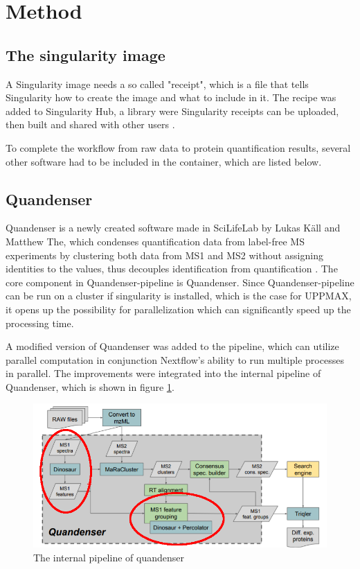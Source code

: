 \section{Method}

\subsection{The singularity image}
A Singularity image needs a so called "receipt", which is a file that tells Singularity how to create the image and what to include in it. The recipe was added to Singularity Hub, a library were Singularity receipts can be uploaded, then built and shared with other users \cite{singularity-hub}.

To complete the workflow from raw data to protein quantification results, several other software had to be included in the container, which are listed below.

\subsection{Quandenser} \label{ssec:quandenser-method}
Quandenser is a newly created software made in SciLifeLab by Lukas Käll and Matthew The, which condenses quantification data from label-free MS experiments by clustering both data from MS1 and MS2 without assigning identities to the values, thus decouples identification from quantification \cite{quandenser}. The core component in Quandenser-pipeline is Quandenser. Since Quandenser-pipeline can be run on a cluster if singularity is installed, which is the case for UPPMAX, it opens up the possibility for parallelization which can significantly speed up the processing time.

A modified version of Quandenser was added to the pipeline, which can utilize parallel computation in conjunction Nextflow's ability to run multiple processes in parallel. The improvements were integrated into the internal pipeline of Quandenser, which is shown in figure \ref{fig:quandenser-internal-pipeline}.

\begin{figure}[H]
  \centering
  \includegraphics[width=\linewidth]{pictures/quandenser-internal.png}
  \caption{The internal pipeline of quandenser \cite{quandenser}}
  \label{fig:quandenser-internal-pipeline}
\end{figure}

